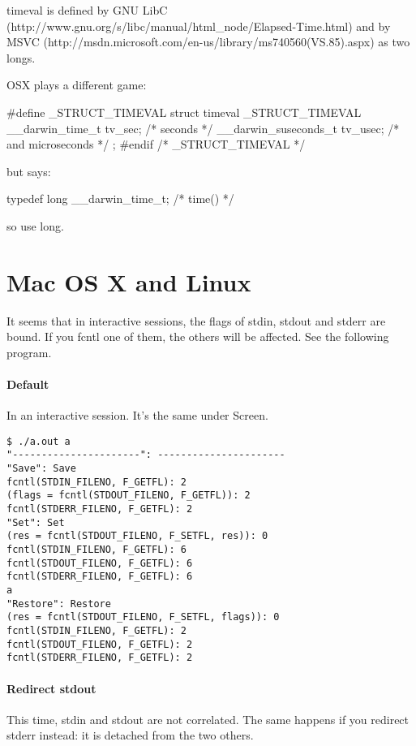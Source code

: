 \documentclass[openright,twoside,11pt]{book}
\begin{document}
timeval is defined by GNU LibC
(http://www.gnu.org/s/libc/manual/html_node/Elapsed-Time.html) and by MSVC
(http://msdn.microsoft.com/en-us/library/ms740560(VS.85).aspx) as two longs.

OSX plays a different game:

\begin{cxx}
#define _STRUCT_TIMEVAL         struct timeval
_STRUCT_TIMEVAL
{
        __darwin_time_t         tv_sec;         /* seconds */
        __darwin_suseconds_t    tv_usec;        /* and microseconds */
};
#endif /* _STRUCT_TIMEVAL */
\end{cxx}

\noindent
but  says:

\begin{cxx}
typedef long                 __darwin_time_t;        /* time() */
\end{cxx}

\noindent

so use long.

\section{Mac OS X and Linux}

It seems that in interactive sessions, the flags of stdin, stdout and stderr
are bound.  If you fcntl one of them, the others will be affected.  See the
following program.



\paragraph{Default}
In an interactive session.  It's the same under Screen.
\begin{lstlisting}
$ ./a.out a
"----------------------": ----------------------
"Save": Save
fcntl(STDIN_FILENO, F_GETFL): 2
(flags = fcntl(STDOUT_FILENO, F_GETFL)): 2
fcntl(STDERR_FILENO, F_GETFL): 2
"Set": Set
(res = fcntl(STDOUT_FILENO, F_SETFL, res)): 0
fcntl(STDIN_FILENO, F_GETFL): 6
fcntl(STDOUT_FILENO, F_GETFL): 6
fcntl(STDERR_FILENO, F_GETFL): 6
a
"Restore": Restore
(res = fcntl(STDOUT_FILENO, F_SETFL, flags)): 0
fcntl(STDIN_FILENO, F_GETFL): 2
fcntl(STDOUT_FILENO, F_GETFL): 2
fcntl(STDERR_FILENO, F_GETFL): 2
\end{lstlisting}

\paragraph{Redirect stdout}
This time, stdin and stdout are not correlated.  The same happens if you
redirect stderr instead: it is detached from the two others.
\end{document}
